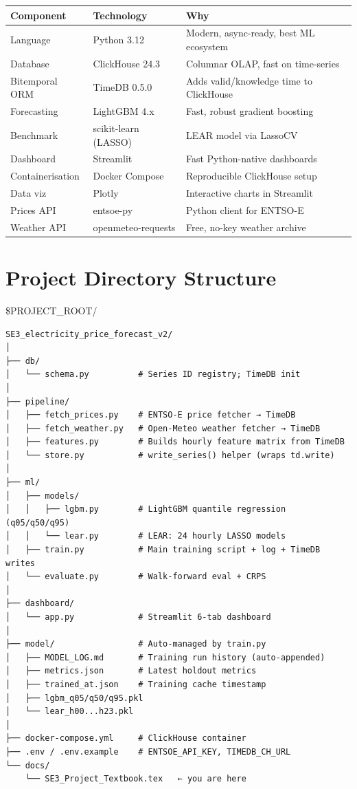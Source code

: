 \documentclass[12pt, a4paper, oneside]{memoir}
\begin{document}
\begin{center}
\begin{tabularx}{\linewidth}{llX}
\toprule
\textbf{Component} & \textbf{Technology} & \textbf{Why} \\
\midrule
Language        & Python 3.12          & Modern, async-ready, best ML ecosystem \\
Database        & ClickHouse 24.3      & Columnar OLAP, fast on time-series \\
Bitemporal ORM  & TimeDB 0.5.0         & Adds valid/knowledge time to ClickHouse \\
Forecasting     & LightGBM 4.x         & Fast, robust gradient boosting \\
Benchmark       & scikit-learn (LASSO) & LEAR model via LassoCV \\
Dashboard       & Streamlit            & Fast Python-native dashboards \\
Containerisation & Docker Compose      & Reproducible ClickHouse setup \\
Data viz        & Plotly               & Interactive charts in Streamlit \\
Prices API      & entsoe-py            & Python client for ENTSO-E \\
Weather API     & openmeteo-requests   & Free, no-key weather archive \\
\bottomrule
\end{tabularx}
\end{center}

\section{Project Directory Structure}

\begin{codefile}{\$PROJECT\_ROOT/}
\footnotesize
\begin{verbatim}
SE3_electricity_price_forecast_v2/
│
├── db/
│   └── schema.py          # Series ID registry; TimeDB init
│
├── pipeline/
│   ├── fetch_prices.py    # ENTSO-E price fetcher → TimeDB
│   ├── fetch_weather.py   # Open-Meteo weather fetcher → TimeDB
│   ├── features.py        # Builds hourly feature matrix from TimeDB
│   └── store.py           # write_series() helper (wraps td.write)
│
├── ml/
│   ├── models/
│   │   ├── lgbm.py        # LightGBM quantile regression (q05/q50/q95)
│   │   └── lear.py        # LEAR: 24 hourly LASSO models
│   ├── train.py           # Main training script + log + TimeDB writes
│   └── evaluate.py        # Walk-forward eval + CRPS
│
├── dashboard/
│   └── app.py             # Streamlit 6-tab dashboard
│
├── model/                 # Auto-managed by train.py
│   ├── MODEL_LOG.md       # Training run history (auto-appended)
│   ├── metrics.json       # Latest holdout metrics
│   ├── trained_at.json    # Training cache timestamp
│   ├── lgbm_q05/q50/q95.pkl
│   └── lear_h00...h23.pkl
│
├── docker-compose.yml     # ClickHouse container
├── .env / .env.example    # ENTSOE_API_KEY, TIMEDB_CH_URL
└── docs/
    └── SE3_Project_Textbook.tex   ← you are here
\end{verbatim}
\end{codefile}
\end{document}
